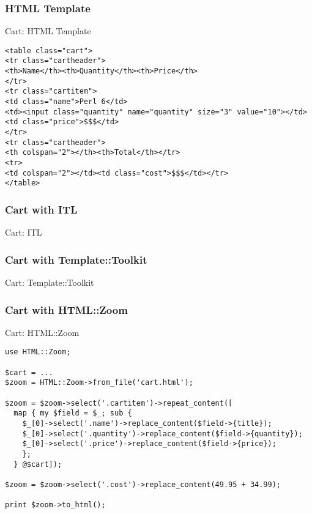 \subsubsection{HTML Template}
\begin{frame}[fragile]{Cart: HTML Template}
\begin{lstlisting}
<table class="cart">
<tr class="cartheader">
<th>Name</th><th>Quantity</th><th>Price</th>
</tr>
<tr class="cartitem">
<td class="name">Perl 6</td>
<td><input class="quantity" name="quantity" size="3" value="10"></td>
<td class="price">$$$</td>
</tr>
<tr class="cartheader">
<th colspan="2"></th><th>Total</th></tr>
<tr>
<td colspan="2"></td><td class="cost">$$$</td></tr>
</table>
\end{lstlisting}
\end{frame}
\subsubsection{Cart with ITL}
\begin{frame}[fragile]{Cart: ITL}

\end{frame}
\subsubsection{Cart with Template::Toolkit}
\begin{frame}[fragile]{Cart: Template::Toolkit}

\end{frame}
\subsubsection{Cart with HTML::Zoom}
\begin{frame}[fragile]{Cart: HTML::Zoom}
\begin{lstlisting}
use HTML::Zoom;

$cart = ...
$zoom = HTML::Zoom->from_file('cart.html');

$zoom = $zoom->select('.cartitem')->repeat_content([
  map { my $field = $_; sub {
    $_[0]->select('.name')->replace_content($field->{title});
    $_[0]->select('.quantity')->replace_content($field->{quantity});
    $_[0]->select('.price')->replace_content($field->{price});
    };
  } @$cart]);

$zoom = $zoom->select('.cost')->replace_content(49.95 + 34.99);

print $zoom->to_html();
\end{lstlisting}
\end{frame}
